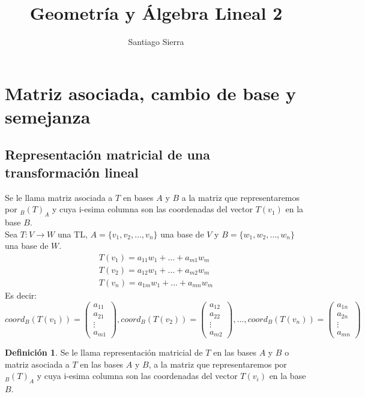 \documentclass[10pt]{article}
\title{Geometría y Álgebra Lineal 2}
\author{Santiago Sierra}
\theoremstyle{definition}
\newtheorem{definition}{Definición}[section]
\begin{document}
\maketitle \tableofcontents \newpage
\section{Matriz asociada, cambio de base y semejanza}
\subsection{Representación matricial de una transformación lineal}
Se le llama matriz asociada a $T$ en bases $A$ y $B$ a la matriz que representaremos por $_B(T)_A$ y cuya i-esima columna son las coordenadas del vector $T(v_1)$ en la base $B$.\\
Sea $T:V\rightarrow W$ una TL, $A=\{v_{1} ,v_{2} ,\dotsc ,v_{n}\}$ una base de $V$ y $B=\{w_{1} ,w_{2} ,\dotsc ,w_{n}\}$ una base de $W$.
$$\begin{array}{l}
		T(v_1)=a_{11}w_1+…+a_{m1}w_m \\
		T(v_2)=a_{12}w_1+…+a_{m2}w_m \\
		T(v_n)=a_{1m}w_1+…+a_{mn}w_m
	\end{array}$$
Es decir:
$$coord_B(T(v_1))=\left(\begin{matrix}a_{11}\\a_{21}\\ \vdots \\a_{m1}\end{matrix}\right), coord_B(T(v_2))=\left(\begin{matrix}a_{12}\\a_{22}\\ \vdots \\ a_{m2}\end{matrix}\right), \dots, coord_B(T(v_n))=\left(\begin{matrix}a_{1n}\\a_{2n}\\\vdots \\ a_{mn}\end{matrix}\right)$$
\begin{definition}
	Se le llama representación matricial de $T$ en las bases $A$ y $B$ o matriz asociada a $T$ en las bases $A$ y $B$, a la matriz que representaremos por $_B(T)_A$ y cuya i-esima columna son las coordenadas del vector $T(v_i)$ en la base $B$.
\end{definition}
\end{document}
